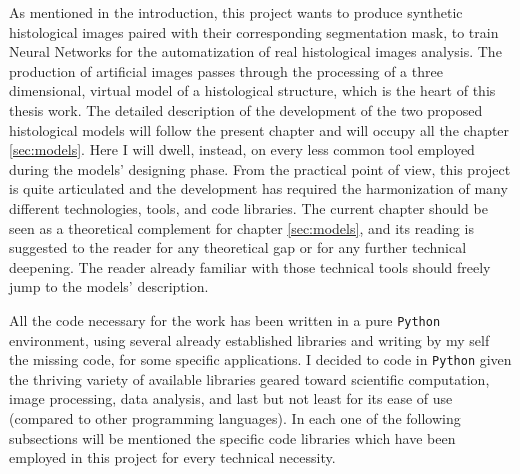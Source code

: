 As mentioned in the introduction, this project wants to produce synthetic histological images paired with their corresponding segmentation mask, to train Neural Networks for the automatization of real histological images analysis. The production of artificial images passes through the processing of a three dimensional, virtual model of a histological structure, which is the heart of this thesis work. The detailed description of the development of the two proposed histological models will follow the present chapter and will occupy all the chapter \ref{sec:models}. Here I will dwell, instead, on every less common tool employed during the models' designing phase. From the practical point of view, this project is quite articulated and the development has required the harmonization of many different technologies, tools, and code libraries. The current chapter should be seen as a theoretical complement for chapter \ref{sec:models}, and its reading is suggested to the reader for any theoretical gap or for any further technical deepening. The reader already familiar with those technical tools should freely jump to the models' description.

All the code necessary for the work has been written in a pure \texttt{Python} environment, using several already established libraries and writing by my self the missing code, for some specific applications. I decided to code in \texttt{Python} given the thriving variety of available libraries geared toward scientific computation, image processing, data analysis, and last but not least for its ease of use (compared to other programming languages). In each one of the following subsections will be mentioned the specific code libraries which have been employed in this project for every technical necessity.
